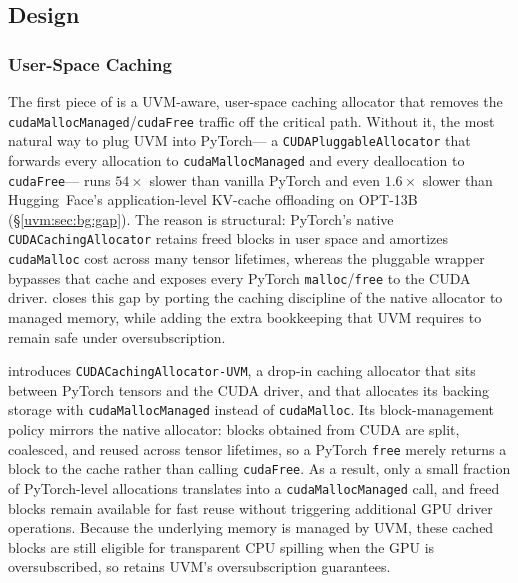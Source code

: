 \subsection{Design}
\label{uvm:sec:design}


\subsubsection{User-Space Caching}
\label{uvm:sec:design:caching}

The first piece of {\uvmname} is a UVM-aware,
    user-space caching allocator that removes the
    \texttt{cudaMallocManaged}/\texttt{cudaFree} traffic off the critical path.
Without it, the most natural way to plug UVM into PyTorch---%
    a \texttt{CUDAPluggableAllocator} that forwards every allocation
    to \texttt{cudaMallocManaged} and every deallocation to \texttt{cudaFree}---%
    runs $54\times$ slower than vanilla PyTorch
    and even $1.6\times$ slower than Hugging~Face's
    application-level KV-cache offloading
    on OPT-13B (\S\ref{uvm:sec:bg:gap}).
The reason is structural:
    PyTorch's native \texttt{CUDACachingAllocator}
    retains freed blocks in user space and amortizes
    \texttt{cudaMalloc} cost across many tensor lifetimes,
    whereas the pluggable wrapper bypasses that cache and exposes
    every PyTorch \texttt{malloc}/\texttt{free} to the CUDA driver.
{\uvmname} closes this gap by porting the caching discipline
    of the native allocator to managed memory,
    while adding the extra bookkeeping that UVM requires
    to remain safe under oversubscription.

{\uvmname} introduces \texttt{CUDACachingAllocator-UVM},
    a drop-in caching allocator that sits between
    PyTorch tensors and the CUDA driver,
    and that allocates its backing storage with \texttt{cudaMallocManaged}
    instead of \texttt{cudaMalloc}.
Its block-management policy mirrors the native allocator:
    blocks obtained from CUDA are split, coalesced,
    and reused across tensor lifetimes,
    so a PyTorch \texttt{free} merely returns a block to the cache
    rather than calling \texttt{cudaFree}.
As a result, only a small fraction of PyTorch-level allocations
    translates into a \texttt{cudaMallocManaged} call,
    and freed blocks remain available for fast reuse without triggering additional GPU driver operations.
Because the underlying memory is managed by UVM,
    these cached blocks are still eligible for transparent CPU spilling
    when the GPU is oversubscribed,
    so {\uvmname} retains UVM's oversubscription guarantees.

